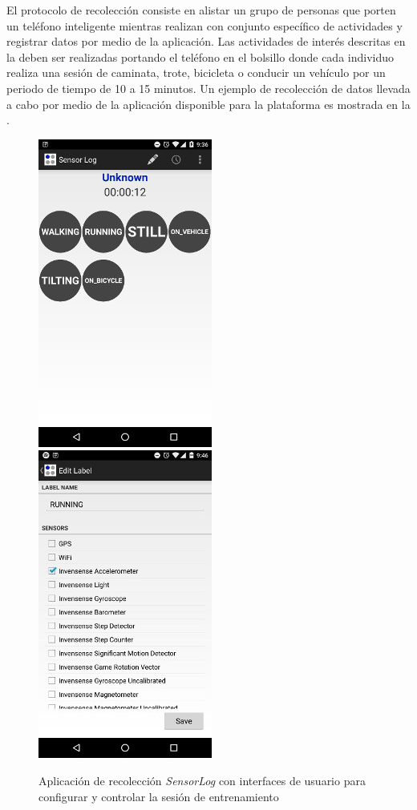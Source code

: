 El protocolo de recolección consiste en alistar un grupo de personas
que porten un teléfono inteligente mientras realizan con conjunto
específico de actividades y registrar datos por medio de la aplicación.
Las actividades de interés descritas en la 
deben ser realizadas portando el teléfono en el bolsillo donde cada
individuo realiza una sesión de caminata, trote, bicicleta o conducir
un vehículo por un periodo de tiempo de 10 a 15 minutos. Un ejemplo
de recolección de datos llevada a cabo por medio de la aplicación
disponible para la plataforma\emph{ } es mostrada en
la . 

\begin{figure}[!tbph]
\begin{centering}
\includegraphics[scale=0.7]{capitulo-4/graphics/sensorlog1} \includegraphics[scale=0.7]{capitulo-4/graphics/sensorlog2}
\par\end{centering}
\caption[Aplicación de recolección \emph{SensorLog}]{\label{fig4:sensor-log}Aplicación de recolección \emph{SensorLog
}con interfaces de usuario para configurar y controlar la sesión de
entrenamiento}
\end{figure}

